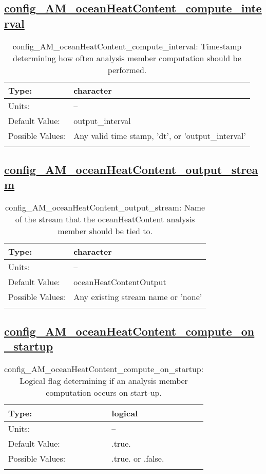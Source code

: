 \subsection[config\_AM\_oceanHeatContent\_compute\_interval]{\hyperref[sec:nm_tab_AM_oceanHeatContent]{config\_AM\_oceanHeatContent\_compute\_interval}}
\label{subsec:nm_sec_config_AM_oceanHeatContent_compute_interval}
\begin{center}
\begin{longtable}{| p{2.0in} || p{4.0in} |}
    \hline
    Type: & character \\
    \hline
    Units: & -- \\
    \hline
    Default Value: & output\_interval \\
    \hline
    Possible Values: & Any valid time stamp, 'dt', or 'output\_interval' \\
    \hline
    \caption{config\_AM\_oceanHeatContent\_compute\_interval: Timestamp determining how often analysis member computation should be performed.}
\end{longtable}
\end{center}
\subsection[config\_AM\_oceanHeatContent\_output\_stream]{\hyperref[sec:nm_tab_AM_oceanHeatContent]{config\_AM\_oceanHeatContent\_output\_stream}}
\label{subsec:nm_sec_config_AM_oceanHeatContent_output_stream}
\begin{center}
\begin{longtable}{| p{2.0in} || p{4.0in} |}
    \hline
    Type: & character \\
    \hline
    Units: & -- \\
    \hline
    Default Value: & oceanHeatContentOutput \\
    \hline
    Possible Values: & Any existing stream name or 'none' \\
    \hline
    \caption{config\_AM\_oceanHeatContent\_output\_stream: Name of the stream that the oceanHeatContent analysis member should be tied to.}
\end{longtable}
\end{center}
\subsection[config\_AM\_oceanHeatContent\_compute\_on\_startup]{\hyperref[sec:nm_tab_AM_oceanHeatContent]{config\_AM\_oceanHeatContent\_compute\_on\_startup}}
\label{subsec:nm_sec_config_AM_oceanHeatContent_compute_on_startup}
\begin{center}
\begin{longtable}{| p{2.0in} || p{4.0in} |}
    \hline
    Type: & logical \\
    \hline
    Units: & -- \\
    \hline
    Default Value: & .true. \\
    \hline
    Possible Values: & .true. or .false. \\
    \hline
    \caption{config\_AM\_oceanHeatContent\_compute\_on\_startup: Logical flag determining if an analysis member computation occurs on start-up.}
\end{longtable}
\end{center}
